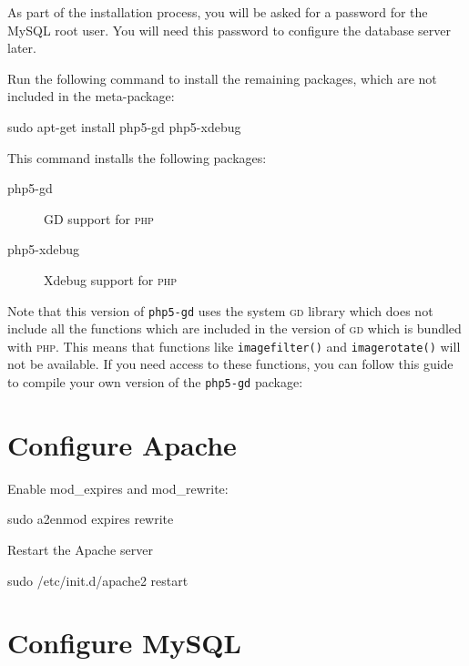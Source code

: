 \documentclass[draft,ebook,10pt,twoside,openright]{memoir}
\begin{document}
As part of the installation process, you will be asked for a password for the MySQL root user. You will need this password to configure the database server later.

Run the following command to install the remaining packages, which are not included in the meta-package:

\begin{squashboxcommand}
sudo apt-get install php5-gd php5-xdebug
\end{squashboxcommand}

This command installs the following packages:

\begin{description}
\item[php5-gd] GD support for \textsc{php}
\item[php5-xdebug] Xdebug support for \textsc{php}
\end{description}

Note that this version of \verb!php5-gd! uses the system \textsc{gd} library which does not include all the functions which are included in the version of \textsc{gd} which is bundled with \textsc{php}. This means that functions like \verb!imagefilter()! and \verb!imagerotate()! will not be available. If you need access to these functions, you can follow this guide to compile your own version of the \verb!php5-gd! package:


\section{Configure Apache}

Enable mod\_expires and mod\_rewrite:

\begin{squashboxcommand}
sudo a2enmod expires rewrite
\end{squashboxcommand}

Restart the Apache server

\begin{squashboxcommand}
sudo /etc/init.d/apache2 restart
\end{squashboxcommand}

\section{Configure MySQL}
\end{document}
